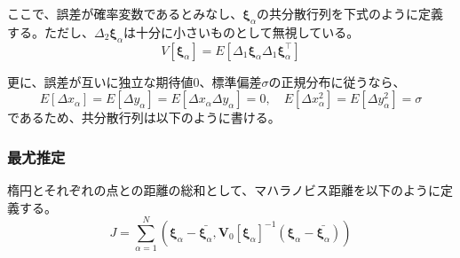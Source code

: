 \documentclass[12pt,a4j]{jsarticle}
\newcommand{\xa}{x_\alpha}
\newcommand{\ya}{y_\alpha}
\newcommand{\xia}{\bm{\xi}_\alpha}
\begin{document}
      ここで、誤差が確率変数であるとみなし、$\xia$の共分散行列を下式のように定義する。ただし、$\Delta_2\xia$は十分に小さいものとして無視している。
      \begin{equation}
        V[\xia] = E[\Delta_1\xia\Delta_1\xia^\top]
      \end{equation}

      更に、誤差が互いに独立な期待値$0$、標準偏差$\sigma$の正規分布に従うなら、
      \begin{equation}
        E[\Delta\xa] = E[\Delta\ya] = E[\Delta\xa\Delta\ya] = 0, \quad E[\Delta\xa^2] = E[\Delta\ya^2] = \sigma
      \end{equation}
      であるため、共分散行列は以下のように書ける。
    
    \subsubsection*{最尤推定}
      楕円とそれぞれの点との距離の総和として、マハラノビス距離を以下のように定義する。
      \begin{equation}
        J = \sum_{\alpha = 1}^N \left(\xia - \bar{\xia}, \bm{V}_0[\xia]^{-1} (\xia - \bar{\xia}) \right)
      \end{equation}
\end{document}
